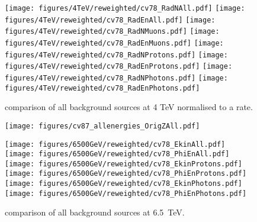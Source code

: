 \begin{figure}
\begin{center}
  \texttt{[image: figures/4TeV/reweighted/cv78\_RadNAll.pdf]}
  \texttt{[image: figures/4TeV/reweighted/cv78\_RadEnAll.pdf]}
  \texttt{[image: figures/4TeV/reweighted/cv78\_RadNMuons.pdf]}
  \texttt{[image: figures/4TeV/reweighted/cv78\_RadEnMuons.pdf]}
  \texttt{[image: figures/4TeV/reweighted/cv78\_RadNProtons.pdf]}
  \texttt{[image: figures/4TeV/reweighted/cv78\_RadEnProtons.pdf]}
  \texttt{[image: figures/4TeV/reweighted/cv78\_RadNPhotons.pdf]}
  \texttt{[image: figures/4TeV/reweighted/cv78\_RadEnPhotons.pdf]}
\end{center}
\vspace{-0.6cm}
 \caption{comparison of all background sources at 4 TeV normalised to a rate.
  \label{compAllBKG4TeV_rates2}}
\end{figure}

\begin{figure}
\begin{center}
  \texttt{[image: figures/cv87\_allenergies\_OrigZAll.pdf]}
\end{center}
\vspace{-0.6cm}
 \caption{
  \label{fig:OrigZMuonAllEn2}} 
\end{figure}



\begin{figure}
\begin{center}
  \texttt{[image: figures/6500GeV/reweighted/cv78\_EkinAll.pdf]}
  \texttt{[image: figures/6500GeV/reweighted/cv78\_PhiEnAll.pdf]}
  \texttt{[image: figures/6500GeV/reweighted/cv78\_EkinProtons.pdf]}
  \texttt{[image: figures/6500GeV/reweighted/cv78\_PhiEnProtons.pdf]}
 \texttt{[image: figures/6500GeV/reweighted/cv78\_EkinPhotons.pdf]}
 \texttt{[image: figures/6500GeV/reweighted/cv78\_PhiEnPhotons.pdf]}
\end{center}
\vspace{-0.6cm}
 \caption{comparison of all background sources at 6.5~TeV.
  \label{compAllBKG_6.52}}
\end{figure}

